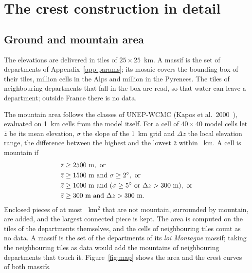 \section{The crest construction in detail}\label{app:construction}

\subsection{Ground and mountain area}\label{sec:data}

The elevations are delivered in tiles of $25\times25$~km. A massif is the set of departments of Appendix~\ref{app:params}; its mosaic covers the
bounding box of their tiles, \CgAlpsCells{} million cells in the Alps and \CgPyrCells{} million in the Pyrenees. The tiles of neighbouring departments that fall in the box are read, so that water can leave a department;
outside France there is no data.

The mountain area follows the classes of UNEP-WCMC (Kapos et al.\ 2000~\cite{kapos}), evaluated on 1~km cells from the model itself. For a cell of $40\times40$ model cells let $\bar z$ be its mean elevation, $\sigma$ the
slope of the 1~km grid and $\Delta z$ the local elevation range, the difference between the highest and the lowest $\bar z$ within \CgPMountainRadius~km. A cell is mountain if
\begin{equation}
  \begin{aligned}
  &\bar z \ge 2500~\mathrm{m},\ \text{or}\\
  &\bar z \ge 1500~\mathrm{m}\text{ and }\sigma \ge 2^\circ,\ \text{or}\\
  &\bar z \ge 1000~\mathrm{m}\text{ and }(\sigma \ge 5^\circ\text{ or }\Delta z > \CgPMountainRange~\mathrm{m}),\ \text{or}\\
  &\bar z \ge 300~\mathrm{m}\text{ and }\Delta z > \CgPMountainRange~\mathrm{m}.
  \end{aligned}
  \label{eq:kapos}
\end{equation}
Enclosed pieces of at most \CgPBasinKm~km$^2$ that are not mountain, surrounded by mountain, are added, and the largest connected piece is kept. The area is computed on the tiles
of the departments themselves, and the cells of neighbouring tiles count as no data. A massif is the set of the departments of its \emph{loi Montagne} massif; taking the neighbouring tiles
as data would add the mountains of neighbouring departments that touch it. Figure~\ref{fig:map} shows the area and the crest curves of both massifs.

